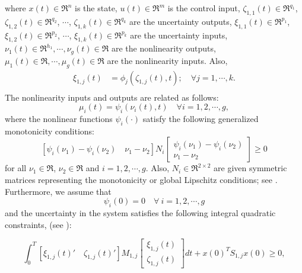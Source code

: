 \documentclass[twocolumn]{autart}
\begin{document}
\noindent where $x(t)\in \Re^{{n}}$ is the state, $u(t)\in \Re^{{m}}$ is the control input, $\zeta_{1,1}(t)\in \Re^{q_1}$, $\zeta_{1,2}(t)\in \Re^{q_2}$, $\cdots$, $\zeta_{1,k}(t)\in \Re^{q_k}$ are the uncertainty outputs, $\xi_{1,1}(t)\in \Re^{p_1}$, $\xi_{1,2}(t)\in \Re^{p_2}$, $\cdots$, $\xi_{1,k}(t)\in \Re^{p_k}$ are the uncertainty inputs, $\nu_1(t)\in \Re^{h_1}, \cdots, \nu_g(t)\in \Re$ are the nonlinearity outputs, $\mu_1(t)\in \Re, \cdots, \mu_g(t)\in \Re$ are the nonlinearity inputs.
Also,
\begin{equation}
\begin{split}
\xi_{1,j}(t)&=\phi_j(\zeta_{1,j}(t),t);\quad \forall j=1,\cdots,k.\\
\end{split}
\end{equation}
The nonlinearity inputs and outputs are related as follows:
\begin{equation}
\label{eqnon1}
\mu_i(t)=\psi_i (\nu_i(t),t) \quad \forall i=1,2, \cdots, g,
\end{equation}
where the nonlinear functions $\psi_i(\cdot)$ satisfy the following generalized monotonicity conditions:
\begin{equation}
\label{eqmon1}
[\psi_i(\nu_1)-\psi_i(\nu_2)\quad \nu_1-\nu_2]N_i\left[
\begin{array}{c}
\psi_i(\nu_1)-\psi_i(\nu_2)\\
\nu_1-\nu_2
\end{array}\right]\geq0
\end{equation}
for all $\nu_1 \in \Re $, $\nu_2 \in \Re$ and $i=1,2, \cdots, g$. Also, $N_i\in \Re^{2\times 2}$ are given symmetric matrices representing the monotonicity or global Lipschitz conditions; see \cite{outputfeedback_petersen}. 
Furthermore, we assume that
\begin{equation}
\label{eqmon2}
\psi_i(0)=0\quad \forall~ i=1,2,\cdots,g
\end{equation}
and the uncertainty in the system satisfies the following integral quadratic constraints, (see \cite{IP}):
\begin{small}
\begin{equation}
\label{eqIQC1}
\int_0^{T}  [\xi_{1,j}(t)' \quad \zeta_{1,j}(t)'] M_{1,j} \left[
\begin{array}{c}
\xi_{1,j}(t)\\
\zeta_{1,j}(t)
\end{array}\right] dt +x(0)^T S_{1,j} x(0)\geq 0,
\end{equation}
\end{small}
\end{document}
